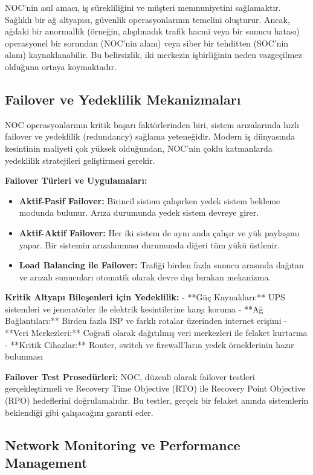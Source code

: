 NOC'nin asıl amacı, iş sürekliliğini ve müşteri memnuniyetini sağlamaktır. Sağlıklı bir ağ altyapısı, güvenlik operasyonlarının temelini oluşturur. Ancak, ağdaki bir anormallik (örneğin, alışılmadık trafik hacmi veya bir sunucu hatası) operasyonel bir sorundan (NOC'nin alanı) veya siber bir tehditten (SOC'nin alanı) kaynaklanabilir. Bu belirsizlik, iki merkezin işbirliğinin neden vazgeçilmez olduğunu ortaya koymaktadır.

\subsection{Failover ve Yedeklilik Mekanizmaları}

NOC operasyonlarının kritik başarı faktörlerinden biri, sistem arızalarında hızlı failover ve yedeklilik (redundancy) sağlama yeteneğidir. Modern iş dünyasında kesintinin maliyeti çok yüksek olduğundan, NOC'nin çoklu katmanlarda yedeklilik stratejileri geliştirmesi gerekir.

\textbf{Failover Türleri ve Uygulamaları:}
\begin{itemize}
    \item \textbf{Aktif-Pasif Failover:} Birincil sistem çalışırken yedek sistem bekleme modunda bulunur. Arıza durumunda yedek sistem devreye girer.
    \item \textbf{Aktif-Aktif Failover:} Her iki sistem de aynı anda çalışır ve yük paylaşımı yapar. Bir sistemin arızalanması durumunda diğeri tüm yükü üstlenir.
    \item \textbf{Load Balancing ile Failover:} Trafiği birden fazla sunucu arasında dağıtan ve arızalı sunucuları otomatik olarak devre dışı bırakan mekanizma.
\end{itemize}

\textbf{Kritik Altyapı Bileşenleri için Yedeklilik:}
- **Güç Kaynakları:** UPS sistemleri ve jeneratörler ile elektrik kesintilerine karşı koruma
- **Ağ Bağlantıları:** Birden fazla ISP ve farklı rotalar üzerinden internet erişimi
- **Veri Merkezleri:** Coğrafi olarak dağıtılmış veri merkezleri ile felaket kurtarma
- **Kritik Cihazlar:** Router, switch ve firewall'ların yedek örneklerinin hazır bulunması

\textbf{Failover Test Prosedürleri:}
NOC, düzenli olarak failover testleri gerçekleştirmeli ve Recovery Time Objective (RTO) ile Recovery Point Objective (RPO) hedeflerini doğrulamalıdır. Bu testler, gerçek bir felaket anında sistemlerin beklendiği gibi çalışacağını garanti eder.

\subsection{Network Monitoring ve Performance Management}

